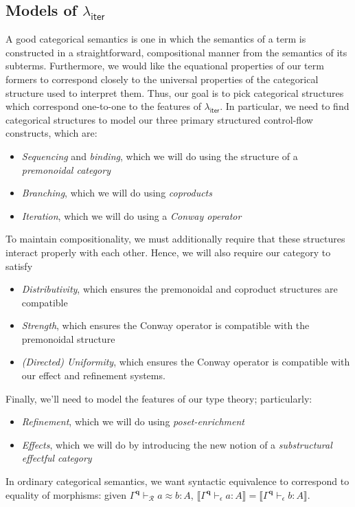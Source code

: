 \documentclass[acmsmall,screen,anonymous,review]{acmart}
\newcommand{\mc}[1]{\ensuremath{\mathcal{#1}}}
\newcommand{\mb}[1]{\ensuremath{\mathbf{#1}}}
\newcommand{\ms}[1]{\ensuremath{\mathsf{#1}}}
\newcommand{\hasty}[4]{#1 \vdash_{#2} #3: {#4}}
\newcommand{\teqv}{\approx}
\newcommand{\tmeq}[5]{#1 \vdash_{#2} #3 \teqv #4 : {#5}}
\newcommand{\dnt}[1]{\llbracket{#1}\rrbracket}
\newcommand{\subiterexp}{\texorpdfstring{\(\lambda_{\ms{iter}}\)}{lambda-iter}}
\begin{document}
\subsection{Models of \subiterexp{}}

A good categorical semantics is one in which the semantics of a term is constructed in a
straightforward, compositional manner from the semantics of its subterms. Furthermore, we would like
the equational properties of our term formers to correspond closely to the universal properties of
the categorical structure used to interpret them. Thus, our goal is to pick categorical structures
which correspond  one-to-one to the features of \subiterexp{}. In particular, we need to find
categorical structures to model our three primary structured control-flow constructs, which are:
\begin{itemize}
  \item \emph{Sequencing} and \emph{binding}, which we will do using the structure of a
  \emph{premonoidal category}
  \item \emph{Branching}, which we will do using \emph{coproducts}
  \item \emph{Iteration}, which we will do using a \emph{Conway operator}
\end{itemize}
To maintain compositionality, we must additionally require that these structures interact properly 
with each other. Hence, we will also require our category to satisfy
\begin{itemize}
  \item \emph{Distributivity}, which ensures the premonoidal and coproduct structures are compatible
  \item \emph{Strength}, which ensures the Conway operator is compatible with the premonoidal
  structure
  \item \emph{(Directed) Uniformity}, which ensures the Conway operator is compatible with our
  effect and refinement systems.
\end{itemize}
Finally, we'll need to model the features of our type theory; particularly:
\begin{itemize}
  \item \emph{Refinement}, which we will do using \emph{poset-enrichment}
  \item \emph{Effects}, which we will do by introducing the new notion of a \emph{substructural
  effectful category}
\end{itemize}

In ordinary categorical semantics, we want syntactic equivalence to
correspond to equality of morphisms: given $\tmeq{\Gamma^{\mb{q}}}{\mc{R}}{a}{b}{A}$,
$\dnt{\hasty{\Gamma^{\mb{q}}}{\epsilon}{a}{A}} = \dnt{\hasty{\Gamma^{\mb{q}}}{\epsilon}{b}{A}}$. 
\end{document}
